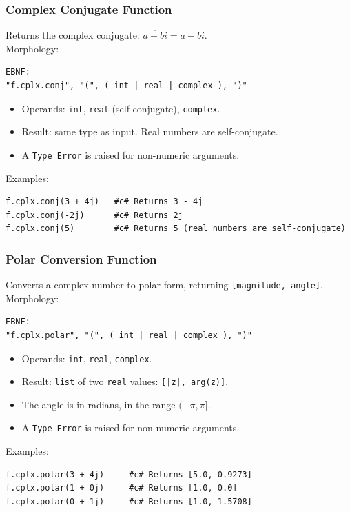 \subsubsection{Complex Conjugate Function}
Returns the complex conjugate: $\overline{a + bi} = a - bi$. \\
Morphology:
\begin{verbatim}
EBNF:
"f.cplx.conj", "(", ( int | real | complex ), ")"
\end{verbatim}
\begin{itemize}
\item Operands: \texttt{int}, \texttt{real} (self-conjugate), \texttt{complex}.
\item Result: same type as input. Real numbers are self-conjugate.
\item A \texttt{Type Error} is raised for non-numeric arguments.
\end{itemize}
Examples:
\begin{verbatim}
f.cplx.conj(3 + 4j)   #c# Returns 3 - 4j
f.cplx.conj(-2j)      #c# Returns 2j
f.cplx.conj(5)        #c# Returns 5 (real numbers are self-conjugate)
\end{verbatim}

\subsubsection{Polar Conversion Function}
Converts a complex number to polar form, returning \texttt{[magnitude, angle]}. \\
Morphology:
\begin{verbatim}
EBNF:
"f.cplx.polar", "(", ( int | real | complex ), ")"
\end{verbatim}
\begin{itemize}
\item Operands: \texttt{int}, \texttt{real}, \texttt{complex}.
\item Result: \texttt{list} of two \texttt{real} values: \texttt{[|z|, arg(z)]}.
\item The angle is in radians, in the range $(-\pi, \pi]$.
\item A \texttt{Type Error} is raised for non-numeric arguments.
\end{itemize}
Examples:
\begin{verbatim}
f.cplx.polar(3 + 4j)     #c# Returns [5.0, 0.9273]
f.cplx.polar(1 + 0j)     #c# Returns [1.0, 0.0]
f.cplx.polar(0 + 1j)     #c# Returns [1.0, 1.5708]
\end{verbatim}

